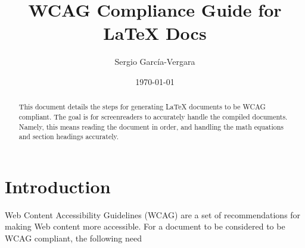 \documentclass[lang=en]{article}
\title{WCAG Compliance Guide for LaTeX Docs}
\author{Sergio Garc\'{i}a-Vergara}
\date{\today}
\begin{document}
\maketitle


% 




\begin{abstract}
  This document details the steps for generating LaTeX documents to be WCAG
  compliant. The goal is for screenreaders to accurately handle the compiled
  documents. Namely, this means reading the document in order, and handling the
  math equations and section headings accurately.


\end{abstract}



\section{Introduction}

Web Content Accessibility Guidelines (WCAG) are a set of recommendations for
making Web content more accessible. For a document to be considered to be WCAG
compliant, the following need
\end{document}
